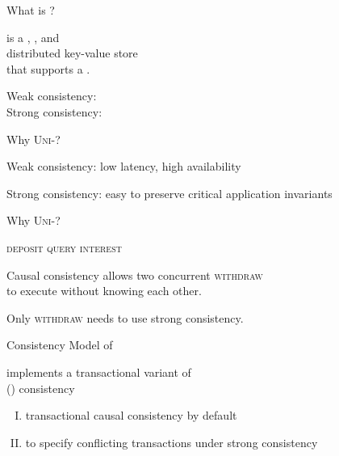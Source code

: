 
\begin{frame}{What is \unistore?}
  \begin{center}
    \unistore{} is a , , and  \\[8pt]
     distributed key-value store \\[8pt]
    that supports a .

    \pause
    \vspace{0.80cm}
    Weak consistency: \cc \\[6pt]
    Strong consistency: \sr
  \end{center}
\end{frame}

\begin{frame}{Why \textsc{Uni-}?}
  \begin{center}
    Weak consistency: low latency, high availability


    Strong consistency: easy to preserve critical application invariants
  \end{center}
\end{frame}

\begin{frame}{Why \textsc{Uni-}?}
  \begin{center}
    \textsc{deposit \quad {} \quad query \quad interest}

    \pause
    \vspace{0.30cm}
    Causal consistency allows two concurrent \textsc{withdraw} \\
    to execute without knowing each other.

    \pause
    \vspace{0.30cm}
    Only \textsc{withdraw} needs to use strong consistency.
  \end{center}
\end{frame}

\begin{frame}{Consistency Model of \unistore}
  \begin{center}
    \unistore{} implements a transactional variant of \\
     (\por) consistency~\purple{
      \footnotesize [Li@ACT'2018]}

    \vspace{0.60cm}
    \begin{enumerate}[(I)]
      \centering
      \item transactional causal consistency by default
      \item to specify conflicting transactions under strong consistency
    \end{enumerate}
  \end{center}
\end{frame}

